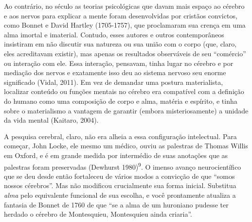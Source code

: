 Ao contrário, no século  as teorias psicológicas que davam mais
espaço ao cérebro e aos nervos para explicar a mente foram desenvolvidas
por cristãos convictos, como Bonnet e David Hartley (1705-1757), que
proclamaram sua crença em uma alma imortal e imaterial. Contudo, esses
autores e outros contemporâneos insistiram em não discutir sua natureza
ou sua união com o corpo (que, claro, eles acreditavam existir), mas
apenas os resultados observáveis de seu ``comércio'' ou interação com
ele. Essa interação, pensavam, tinha lugar no cérebro e por mediação dos
nervos e exatamente isso deu ao sistema nervoso seu enorme significado
(Vidal, 2011). Em vez de demandar uma postura materialista, localizar
conteúdo ou funções mentais no cérebro era compatível com a definição do
humano como uma composição de corpo e alma, matéria e espírito, e tinha
sobre o materialismo a vantagem de garantir (embora misteriosamente) a
unidade da vida mental (Kaitaro, 2004).

A pesquisa cerebral, claro, não era alheia a essa configuração
intelectual. Para começar, John Locke, ele mesmo um médico, ouviu as
palestras de Thomas Willis em Oxford, e é em grande medida por
intermédio de suas anotações que as palestras foram preservadas
(Dewhurst 1980)\textsuperscript{9}. O imenso avanço neurocientífico que
se deu desde então fortaleceu de vários modos a convicção de que ``somos
nossos cérebros''. Mas não modificou crucialmente sua forma inicial.
Substitua \emph{alma} pelo equivalente funcional de sua escolha, e você
prontamente atualiza a fantasia de Bonnet de 1760 de que ``se a alma de
um huroniano pudesse ter herdado o cérebro de Montesquieu, Montesquieu
ainda criaria''.

